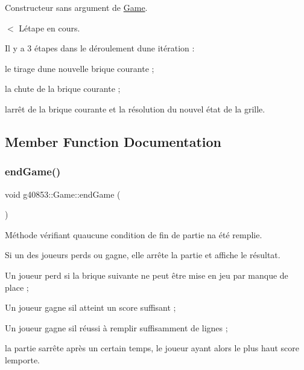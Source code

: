 Constructeur sans argument de \hyperlink{classg40853_1_1_game}{Game}. 

$<$ L\textquotesingle{}étape en cours.

Il y a 3 étapes dans le déroulement d\textquotesingle{}une itération \+:
\begin{DoxyItemize}
\item le tirage d\textquotesingle{}une nouvelle brique courante ;
\item la chute de la brique courante ;
\item l\textquotesingle{}arrêt de la brique courante et la résolution du nouvel état de la grille. 
\end{DoxyItemize}

\subsection{Member Function Documentation}
\hypertarget{classg40853_1_1_game_a0225ae5ad14eaae0b4ff711827951444}{}\label{classg40853_1_1_game_a0225ae5ad14eaae0b4ff711827951444} 
\subsubsection{\texorpdfstring{end\+Game()}{endGame()}}
{\footnotesize\ttfamily void g40853\+::\+Game\+::end\+Game (\begin{DoxyParamCaption}{ }\end{DoxyParamCaption})}



Méthode vérifiant qu\textquotesingle{}aucune condition de fin de partie n\textquotesingle{}a été remplie. 

Si un des joueurs perds ou gagne, elle arrête la partie et affiche le résultat.
\begin{DoxyItemize}
\item Un joueur perd si la brique suivante ne peut être mise en jeu par manque de place ;
\item Un joueur gagne s\textquotesingle{}il atteint un score suffisant ;
\item Un joueur gagne s\textquotesingle{}il réussi à remplir suffisamment de lignes ;
\item la partie s\textquotesingle{}arrête après un certain temps, le joueur ayant alors le plus haut score l\textquotesingle{}emporte. 
\end{DoxyItemize}\hypertarget{classg40853_1_1_game_a09eefcbee51b67f432bc65badaf6647f}{}\label{classg40853_1_1_game_a09eefcbee51b67f432bc65badaf6647f} 
